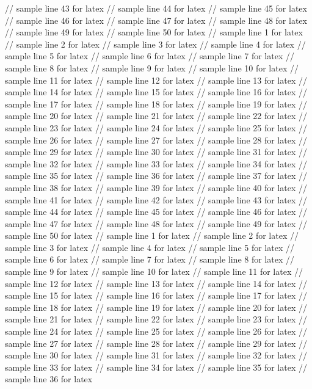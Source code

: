 // sample line 43 for latex
// sample line 44 for latex
// sample line 45 for latex
// sample line 46 for latex
// sample line 47 for latex
// sample line 48 for latex
// sample line 49 for latex
// sample line 50 for latex
// sample line 1 for latex
// sample line 2 for latex
// sample line 3 for latex
// sample line 4 for latex
// sample line 5 for latex
// sample line 6 for latex
// sample line 7 for latex
// sample line 8 for latex
// sample line 9 for latex
// sample line 10 for latex
// sample line 11 for latex
// sample line 12 for latex
// sample line 13 for latex
// sample line 14 for latex
// sample line 15 for latex
// sample line 16 for latex
// sample line 17 for latex
// sample line 18 for latex
// sample line 19 for latex
// sample line 20 for latex
// sample line 21 for latex
// sample line 22 for latex
// sample line 23 for latex
// sample line 24 for latex
// sample line 25 for latex
// sample line 26 for latex
// sample line 27 for latex
// sample line 28 for latex
// sample line 29 for latex
// sample line 30 for latex
// sample line 31 for latex
// sample line 32 for latex
// sample line 33 for latex
// sample line 34 for latex
// sample line 35 for latex
// sample line 36 for latex
// sample line 37 for latex
// sample line 38 for latex
// sample line 39 for latex
// sample line 40 for latex
// sample line 41 for latex
// sample line 42 for latex
// sample line 43 for latex
// sample line 44 for latex
// sample line 45 for latex
// sample line 46 for latex
// sample line 47 for latex
// sample line 48 for latex
// sample line 49 for latex
// sample line 50 for latex
// sample line 1 for latex
// sample line 2 for latex
// sample line 3 for latex
// sample line 4 for latex
// sample line 5 for latex
// sample line 6 for latex
// sample line 7 for latex
// sample line 8 for latex
// sample line 9 for latex
// sample line 10 for latex
// sample line 11 for latex
// sample line 12 for latex
// sample line 13 for latex
// sample line 14 for latex
// sample line 15 for latex
// sample line 16 for latex
// sample line 17 for latex
// sample line 18 for latex
// sample line 19 for latex
// sample line 20 for latex
// sample line 21 for latex
// sample line 22 for latex
// sample line 23 for latex
// sample line 24 for latex
// sample line 25 for latex
// sample line 26 for latex
// sample line 27 for latex
// sample line 28 for latex
// sample line 29 for latex
// sample line 30 for latex
// sample line 31 for latex
// sample line 32 for latex
// sample line 33 for latex
// sample line 34 for latex
// sample line 35 for latex
// sample line 36 for latex
